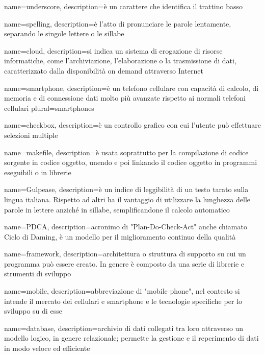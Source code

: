  {
	name=underscore,
	description={è un carattere che identifica il trattino basso}
}

 {
	name=spelling,
	description={è l'atto di pronunciare le parole lentamente, separando le singole lettere o le sillabe}
}

 {
	name=cloud,
	description={si indica un sistema di erogazione di risorse informatiche, come l'archiviazione, l'elaborazione o la trasmissione di dati, caratterizzato dalla disponibilità on demand attraverso Internet}
}

 {
	name=smartphone,
	description={è un telefono cellulare con capacità di calcolo, di memoria e di connessione dati molto più avanzate rispetto ai normali telefoni cellulari}
	plural=smartphones
}

 {
	name=checkbox,
	description={è un controllo grafico con cui l'utente può effettuare selezioni multiple}
}


 {
	name=makefile,
	description={è usata soprattutto per la compilazione di codice sorgente in codice oggetto, unendo e poi linkando il codice oggetto in programmi eseguibili o in librerie}
}

 {
	name=Gulpease,
	description={è un indice di leggibilità di un testo tarato sulla lingua italiana. Rispetto ad altri ha il vantaggio di utilizzare la lunghezza delle parole in lettere anziché in sillabe, semplificandone il calcolo automatico}
}

 {
	name=PDCA,
	description={acronimo di "Plan-Do-Check-Act" anche chiamato Ciclo di Daming, è un modello per il miglioramento continuo della qualità}
}

 {
	name=framework,
	description={architettura o struttura di supporto su cui un programma può essere creato. In genere è composto da una serie di librerie e strumenti di sviluppo}
}

 {
	name=mobile,
	description={abbreviazione di "mobile phone", nel contesto si intende il mercato dei cellulari e smartphone e le tecnologie specifiche per lo sviluppo su di esse}
}

 {
	name=database,
	description={archivio di dati collegati tra loro attraverso un modello logico, in genere relazionale; permette la gestione e il reperimento di dati in modo veloce ed efficiente}
}

